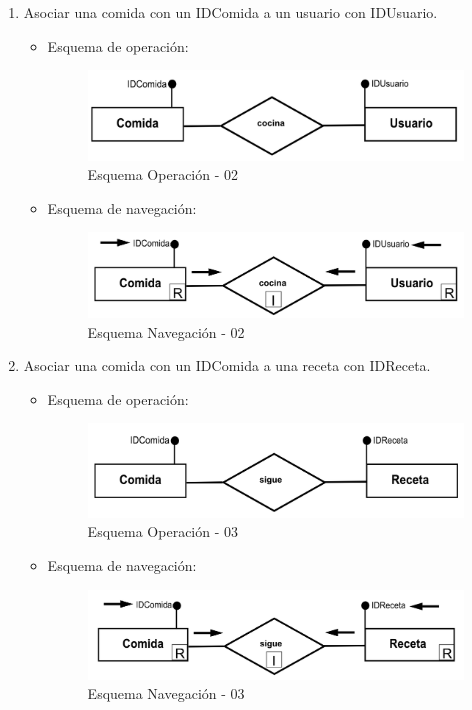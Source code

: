 \documentclass[a4paper,12pt]{report}
\begin{document}
\begin{enumerate}
\item Asociar una comida con un IDComida a un usuario con IDUsuario.
\begin{itemize}
\item Esquema de operación:
\begin{figure}[!htp]
\centering
\includegraphics[width=0.9\linewidth]{./operaciones/img/Comidas/02_ope.png}
\caption{Esquema Operación - 02}
\label{fig:ope02}
\medskip
\footnotesize
{}
\end{figure}
\item Esquema de navegación:
\begin{figure}[!htp]
\centering
\includegraphics[width=0.9\linewidth]{./operaciones/img/Comidas/02_nav.png}
\caption{Esquema Navegación - 02}
\label{fig:nave02}
\medskip
\footnotesize
{}
\end{figure}
\end{itemize}

\item Asociar una comida con un IDComida a una receta con IDReceta.
\begin{itemize}
\item Esquema de operación:
\begin{figure}[!htp]
\centering
\includegraphics[width=0.9\linewidth]{./operaciones/img/Comidas/03_ope.png}
\caption{Esquema Operación - 03}
\label{fig:ope03}
\medskip
\footnotesize
{}
\end{figure}
\item Esquema de navegación:
\begin{figure}[!htp]
\centering
\includegraphics[width=0.9\linewidth]{./operaciones/img/Comidas/03_nav.png}
\caption{Esquema Navegación - 03}
\label{fig:nave03}
\medskip
\footnotesize
{}
\end{figure}
\end{itemize}


\end{enumerate}
\end{document}
